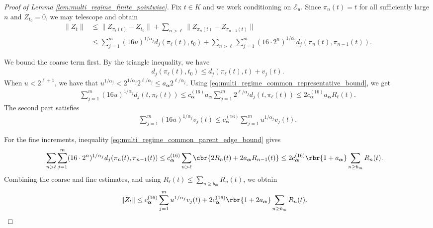 \documentclass[11pt]{article}
\begin{document}
\begin{proof}[Proof of Lemma \ref{lem:multi_regime_finite_pointwise}]
Fix $t\in K$ and we work conditioning on $\mathcal E_u$. Since
$\pi_n(t)=t$ for all sufficiently large $n$ and $Z_{t_0}=0$, we may
telescope and obtain
\begin{align*}
\|Z_t\|
&\le
\|Z_{\pi_\ell(t)}-Z_{t_0}\|
+
\sum_{n>\ell}
\|Z_{\pi_n(t)}-Z_{\pi_{n-1}(t)}\|\\
&\le
\sum_{j=1}^m(16u)^{1/\alpha_j}
d_j(\pi_\ell(t),t_0)+
\sum_{n>\ell}
\sum_{j=1}^m
(16\cdot2^n)^{1/\alpha_j}
d_j(\pi_n(t),\pi_{n-1}(t)).
\end{align*}

We bound the coarse term first. By the triangle inequality, we have
\begin{align*}
d_j(\pi_\ell(t),t_0)
\le
d_j(\pi_\ell(t),t)+v_j(t).
\end{align*}
When $u<2^{\ell+1}$, we have that $u^{1/\alpha_j}
<
2^{1/\alpha_j}2^{\ell/\alpha_j}
\le
a_{\boldsymbol\alpha}2^{\ell/\alpha_j}$.
Using \eqref{eq:multi_regime_common_representative_bound}, we get
\begin{align*}
\sum_{j=1}^m
(16u)^{1/\alpha_j}
d_j(t,\pi_\ell(t))\le
c_{\boldsymbol\alpha}^{(16)}a_{\boldsymbol\alpha}
\sum_{j=1}^m
2^{\ell/\alpha_j}d_j(t,\pi_\ell(t))\le
2c_{\boldsymbol\alpha}^{(16)}a_{\boldsymbol\alpha}R_\ell(t).
\end{align*}
The second part satisfies
\begin{align*}
\sum_{j=1}^m
(16u)^{1/\alpha_j}v_j(t)
\le
c_{\boldsymbol\alpha}^{(16)}
\sum_{j=1}^m u^{1/\alpha_j}v_j(t).
\end{align*}

For the fine increments, inequality
\eqref{eq:multi_regime_common_parent_edge_bound} gives
\begin{align*}
&\sum_{n>\ell}
\sum_{j=1}^m
(16\cdot2^n)^{1/\alpha_j}
d_j(\pi_n(t),\pi_{n-1}(t))\le
c_{\boldsymbol\alpha}^{(16)}
\sum_{n>\ell}
\cbr{
2R_n(t)+2a_{\boldsymbol\alpha}R_{n-1}(t)
}\le
2c_{\boldsymbol\alpha}^{(16)}
\rbr{1+a_{\boldsymbol\alpha}}
\sum_{n\ge b_m}R_n(t).
\end{align*}
Combining the coarse and fine estimates, and using
$R_\ell(t)\le\sum_{n\ge b_m}R_n(t)$, we obtain
\begin{align}
\|Z_t\|
&\le
c_{\boldsymbol\alpha}^{(16)}
\sum_{j=1}^m u^{1/\alpha_j}v_j(t)
+
2c_{\boldsymbol\alpha}^{(16)}
\rbr{1+2a_{\boldsymbol\alpha}}
\sum_{n\ge b_m}R_n(t).
\label{eq:multi_regime_common_chain_preconversion}
\end{align}


\end{proof}
\end{document}

